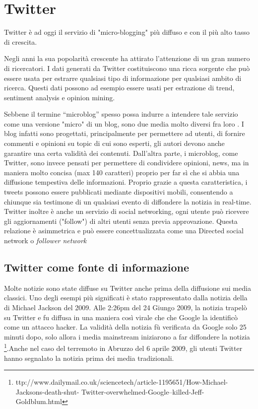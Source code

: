 \section{Twitter}


Twitter è ad oggi il servizio di "micro-blogging" più diffuso e con il più alto tasso di crescita. 

Negli anni la sua popolarità crescente ha attirato l'attenzione di un gran numero di ricercatori. I dati generati da Twitter costituiscono una ricca sorgente che può essere usata per estrarre qualsiasi tipo di informazione per qualsiasi ambito di ricerca. Questi dati possono ad esempio essere usati per estrazione di trend, sentiment analysis e opinion mining.

Sebbene il termine  “microblog” spesso possa indurre a intendere tale servizio come una versione "micro" di un blog, sono due media molto diversi fra loro \cite{export:69500}. I blog infatti sono progettati, principalmente per permettere ad utenti, di fornire commenti e opinioni su topic di cui sono esperti, gli autori devono anche garantire una certa validità dei contenuti. Dall'altra parte, i microblog, come Twitter, sono invece pensati per permettere di condividere opinioni, news, ma in maniera molto concisa (max 140 caratteri) proprio per far sì che si abbia una  diffusione tempestiva delle informazioni. Proprio grazie a questa caratteristica, i tweets possono essere pubblicati mediante dispositivi mobili, consentendo a chiunque sia testimone di un qualsiasi evento di diffondere la notizia in real-time. Twitter inoltre è anche un servizio di social networking, ogni utente può ricevere gli aggiornamenti ("follow")  di altri utenti senza previa approvazione. Questa relazione è asimmetrica e può essere concettualizzata come una Directed social network o \emph{follower network} 
\subsection{Twitter come fonte di informazione}
Molte notizie sono state diffuse su Twitter anche prima della diffusione sui media classici. Uno degli esempi più significati è stato rappresentato dalla notizia della di Michael Jackson del 2009. Alle 2:26pm
del 24 Giungo 2009, la notizia trapelò su Twitter e fu diffusa in una maniera così virale che che Google la identificò come un attacco hacker. La validità della notizia fù verificata da Google solo 25 minuti dopo,   solo allora i media mainstream iniziarono a far diffondere la notizia \footnote{ttp://www.dailymail.co.uk/sciencetech/article-1195651/How-Michael-Jacksons-death-shut-
Twitter-overwhelmed-Google–killed-Jeff-Goldblum.html}.Anche nel caso del terremoto in Abruzzo del 6 aprile 2009, gli utenti Twitter hanno segnalato la notizia prima dei media tradizionali. 
